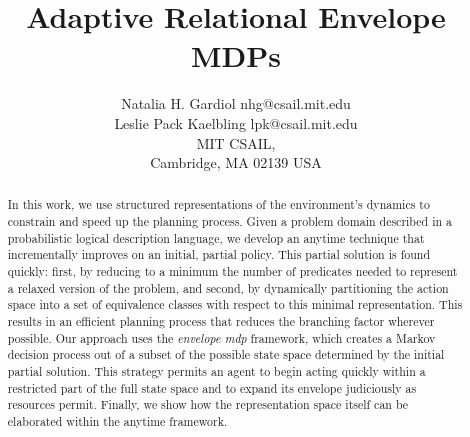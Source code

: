 \newcommand{\opa}[4]{
 \pddldet{ \sym{#1}{#2} }{\paren{#3}}{\paren{#4}}
}

\newcommand{\opb}[7]{
 \pddlstoch{ \sym{#1}{#2} }{ \paren{#3} }{#4}{ \paren{#5} }{#6}{ \paren{#7} }
}
\newcommand{\opbs}[7]{
 \oppretty{ \sym{#1}{#2} }{ \sym{}{#3} }{#4}{ \sym{}{#5} }{#6}{ \sym{}{#7} }
}















\title{Adaptive Relational Envelope MDPs}

\author{\name Natalia H. Gardiol \email nhg@csail.mit.edu \\
       \name Leslie Pack Kaelbling \email lpk@csail.mit.edu \\
       \addr MIT CSAIL,\\
       Cambridge, MA 02139 USA}


\maketitle


\begin{abstract}

In this work, we use structured representations of the environment's dynamics to constrain and speed up the planning process.  
Given a problem domain described in a probabilistic logical description language, 
we develop an anytime technique that incrementally improves on an initial, partial policy. This partial solution is  found quickly: first, by reducing to a minimum the number of predicates needed to represent a relaxed version of the problem, and second, by 
dynamically partitioning the action space into a set of equivalence classes with respect to this minimal representation. 
This results in an efficient planning process that reduces the branching factor wherever possible.
 Our approach uses the 
\emph{envelope {\sc mdp}} framework, which creates a Markov decision process out of a subset of the possible state space determined by the initial partial solution. This strategy permits an agent to begin acting quickly
within a restricted part of the full state space
and to expand its envelope judiciously as resources permit.
Finally, we show how the representation space itself can be elaborated within the anytime framework. 


\end{abstract}

